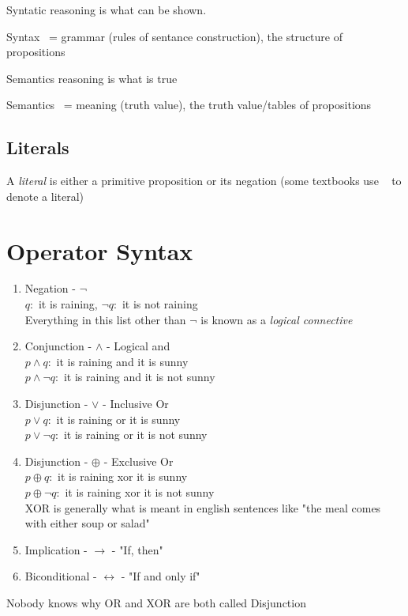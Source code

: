 \documentclass[12pt]{article}
\begin{document}
Syntatic reasoning is what can be shown. 

Syntax ~= grammar (rules of sentance construction), the structure of propositions

Semantics reasoning is what is true

Semantics ~= meaning (truth value), the truth value/tables of propositions

\subsection{Literals}

A \textit{literal} is either a primitive proposition or its negation (some
textbooks use ~ to denote a literal)

\section{Operator Syntax}

\begin{enumerate}
  \item Negation - $\neg$ \\
    $q:$ it is raining, $\neg q:$ it is not raining\\
  Everything in this list other than $\neg $  is known as a \textit{logical connective}
  \item Conjunction - $\land$ - Logical and\\
    $p \land q:$ it is raining and it is sunny \\
    $p \land \neg q:$ it is raining and it is not sunny
  \item Disjunction - $\lor$ - Inclusive Or\\
    $p \lor q:$ it is raining or it is sunny \\
    $p \lor \neg q:$ it is raining or it is not sunny
  \item Disjunction - $\oplus$ - Exclusive Or\\
    $p \oplus q:$ it is raining xor it is sunny \\
    $p \oplus \neg q:$ it is raining xor it is not sunny\\
    XOR is generally what is meant in english sentences like "the meal comes
    with either soup or salad"
  \item Implication - $\to$ - "If, then"
  \item Biconditional - $\leftrightarrow$ - "If and only if"
\end{enumerate}

Nobody knows why OR and XOR are both called Disjunction
\end{document}
